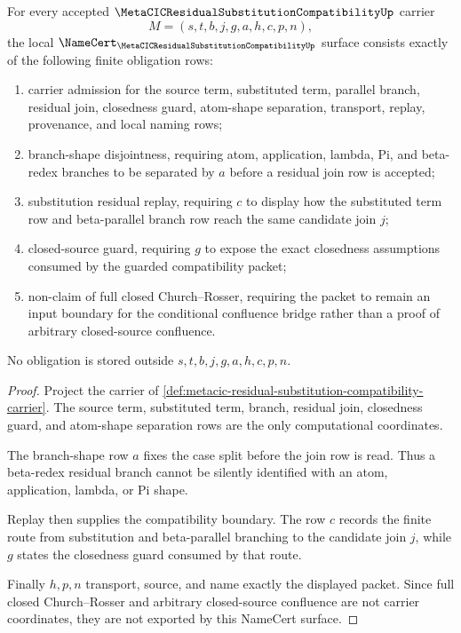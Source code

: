 \begin{theorem}
\label{thm:metacic-residual-substitution-compatibility-namecert-obligations}
For every accepted $\MetaCICResidualSubstitutionCompatibilityUp$ carrier
$$
M=(s,t,b,j,g,a,h,c,p,n),
$$
the local $\NameCert_{\MetaCICResidualSubstitutionCompatibilityUp}$ surface consists exactly of the following finite obligation rows:
\begin{enumerate}
\item carrier admission for the source term, substituted term, parallel branch, residual join, closedness guard, atom-shape separation, transport, replay, provenance, and local naming rows;
\item branch-shape disjointness, requiring atom, application, lambda, Pi, and beta-redex branches to be separated by $a$ before a residual join row is accepted;
\item substitution residual replay, requiring $c$ to display how the substituted term row and beta-parallel branch row reach the same candidate join $j$;
\item closed-source guard, requiring $g$ to expose the exact closedness assumptions consumed by the guarded compatibility packet;
\item non-claim of full closed Church--Rosser, requiring the packet to remain an input boundary for the conditional confluence bridge rather than a proof of arbitrary closed-source confluence.
\end{enumerate}
No obligation is stored outside $s,t,b,j,g,a,h,c,p,n$.
\end{theorem}
\begin{proof}
Project the carrier of \autoref{def:metacic-residual-substitution-compatibility-carrier}. The source term, substituted term, branch, residual join, closedness guard, and atom-shape separation rows are the only computational coordinates.

The branch-shape row $a$ fixes the case split before the join row is read. Thus a beta-redex residual branch cannot be silently identified with an atom, application, lambda, or Pi shape.

Replay then supplies the compatibility boundary. The row $c$ records the finite route from substitution and beta-parallel branching to the candidate join $j$, while $g$ states the closedness guard consumed by that route.

Finally $h,p,n$ transport, source, and name exactly the displayed packet. Since full closed Church--Rosser and arbitrary closed-source confluence are not carrier coordinates, they are not exported by this NameCert surface.
\end{proof}

